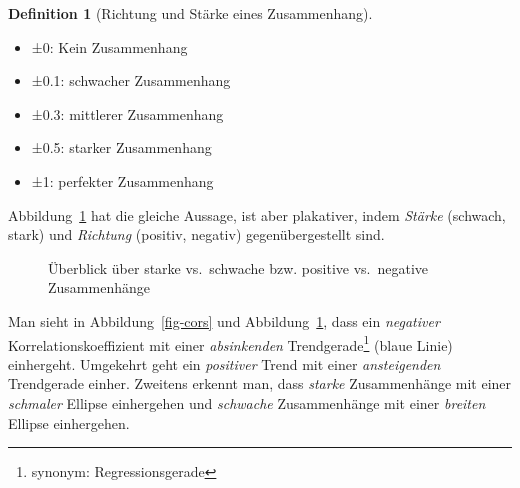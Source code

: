 \documentclass[
  a4paper,
  DIV=11]{scrreprt}
\providecommand{\tightlist}{%
  \setlength{\itemsep}{0pt}\setlength{\parskip}{0pt}}\usepackage{longtable,booktabs,array}
\theoremstyle{definition}
\theoremstyle{definition}
\theoremstyle{definition}
\newtheorem{definition}{Definition}[chapter]
\theoremstyle{remark}
\begin{document}
\begin{definition}[Richtung und Stärke eines
Zusammenhang]
\begin{itemize}
\tightlist
\item
  ±0: Kein Zusammenhang
\item
  ±0.1: schwacher Zusammenhang
\item
  ±0.3: mittlerer Zusammenhang
\item
  ±0.5: starker Zusammenhang
\item
  ±1: perfekter Zusammenhang
\end{itemize}

Abbildung~\ref{fig-cors2} hat die gleiche Aussage, ist aber plakativer,
indem \emph{Stärke} (schwach, stark) und \emph{Richtung} (positiv,
negativ) gegenübergestellt sind.

\begin{figure}


\caption{\label{fig-cors2}Überblick über starke vs.~schwache bzw.
positive vs.~negative Zusammenhänge}

\end{figure}%

Man sieht in Abbildung~\ref{fig-cors} und Abbildung~\ref{fig-cors2},
dass ein \emph{negativer} Korrelationskoeffizient mit einer
\emph{absinkenden} Trendgerade\footnote{synonym: Regressionsgerade}
(blaue Linie) einhergeht. Umgekehrt geht ein \emph{positiver} Trend mit
einer \emph{ansteigenden} Trendgerade einher. Zweitens erkennt man, dass
\emph{starke} Zusammenhänge mit einer \emph{schmaler} Ellipse
einhergehen und \emph{schwache} Zusammenhänge mit einer \emph{breiten}
Ellipse einhergehen.


\end{definition}
\end{document}
